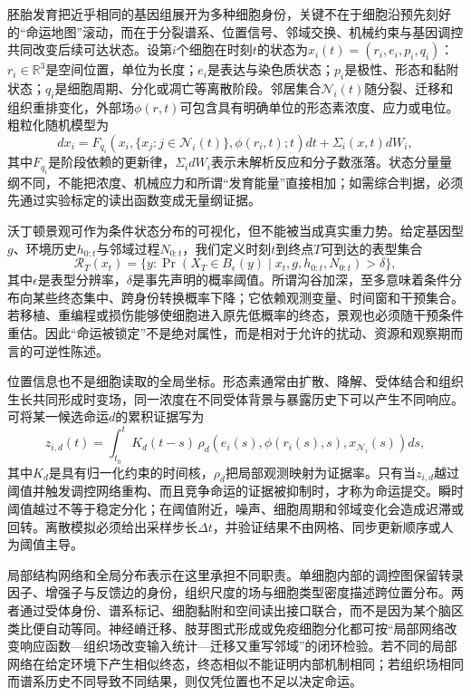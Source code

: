 胚胎发育把近乎相同的基因组展开为多种细胞身份，关键不在于细胞沿预先刻好的“命运地图”滚动，而在于分裂谱系、位置信号、邻域交换、机械约束与基因调控共同改变后续可达状态。设第$i$个细胞在时刻$t$的状态为$x_i(t)=(r_i,e_i,p_i,q_i)$：$r_i\in\mathbb R^3$是空间位置，单位为长度；$e_i$是表达与染色质状态；$p_i$是极性、形态和黏附状态；$q_i$是细胞周期、分化或凋亡等离散阶段。邻居集合$\mathcal N_i(t)$随分裂、迁移和组织重排变化，外部场$\phi(r,t)$可包含具有明确单位的形态素浓度、应力或电位。粗粒化随机模型为
\begin{equation}
 dx_i=F_{q_i}\!\left(x_i,\{x_j:j\in\mathcal N_i(t)\},\phi(r_i,t);t\right)dt+\Sigma_i(x,t)dW_i,
\end{equation}
其中$F_{q_i}$是阶段依赖的更新律，$\Sigma_i dW_i$表示未解析反应和分子数涨落。状态分量量纲不同，不能把浓度、机械应力和所谓“发育能量”直接相加；如需综合判据，必须先通过实验标定的读出函数变成无量纲证据。

沃丁顿景观可作为条件状态分布的可视化，但不能被当成真实重力势。给定基因型$g$、环境历史$h_{0:t}$与邻域过程$N_{0:t}$，我们定义时刻$t$到终点$T$可到达的表型集合
\begin{equation}
 \mathcal R_T(x_t)=\{y:\Pr(X_T\in B_\epsilon(y)\mid x_t,g,h_{0:t},N_{0:t})>\delta\},
\end{equation}
其中$\epsilon$是表型分辨率，$\delta$是事先声明的概率阈值。所谓沟谷加深，至多意味着条件分布向某些终态集中、跨身份转换概率下降；它依赖观测变量、时间窗和干预集合。若移植、重编程或损伤能够使细胞进入原先低概率的终态，景观也必须随干预条件重估。因此“命运被锁定”不是绝对属性，而是相对于允许的扰动、资源和观察期而言的可逆性陈述。

位置信息也不是细胞读取的全局坐标。形态素通常由扩散、降解、受体结合和组织生长共同形成时变场，同一浓度在不同受体背景与暴露历史下可以产生不同响应。可将某一候选命运$d$的累积证据写为
\begin{equation}
 z_{i,d}(t)=\int_{t_0}^{t}K_d(t-s)\,\rho_d\!\left(e_i(s),\phi(r_i(s),s),x_{\mathcal N_i}(s)\right)ds,
\end{equation}
其中$K_d$是具有归一化约束的时间核，$\rho_d$把局部观测映射为证据率。只有当$z_{i,d}$越过阈值并触发调控网络重构、而且竞争命运的证据被抑制时，才称为命运提交。瞬时阈值越过不等于稳定分化；在阈值附近，噪声、细胞周期和邻域变化会造成迟滞或回转。离散模拟必须给出采样步长$\Delta t$，并验证结果不由网格、同步更新顺序或人为阈值主导。

局部结构网络和全局分布表示在这里承担不同职责。单细胞内部的调控图保留转录因子、增强子与反馈边的身份，组织尺度的场与细胞类型密度描述跨位置分布。两者通过受体身份、谱系标记、细胞黏附和空间读出接口联合，而不是因为某个脑区类比便自动等同。神经嵴迁移、肢芽图式形成或免疫细胞分化都可按“局部网络改变响应函数—组织场改变输入统计—迁移又重写邻域”的闭环检验。若不同的局部网络在给定环境下产生相似终态，终态相似不能证明内部机制相同；若组织场相同而谱系历史不同导致不同结果，则仅凭位置也不足以决定命运。

